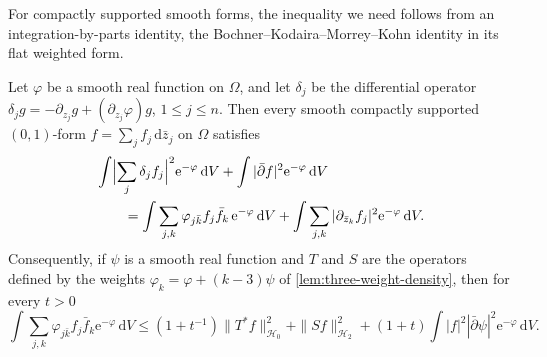 For compactly supported smooth forms, the inequality we need follows from an integration-by-parts identity, the Bochner--Kodaira--Morrey--Kohn identity in its flat weighted form.

\begin{proposition}\label{prop:interior-bochner-identity}
Let $\varphi$ be a smooth real function on $\Omega$, and let $\delta_j$ be the differential operator $\delta_jg=-\partial_{z_j}g+(\partial_{z_j}\varphi)g$, $1\le j\le n$. Then every smooth compactly supported $(0,1)$-form $f=\sum_jf_j\,\mathrm d\bar z_j$ on $\Omega$ satisfies
\[
 \begin{split}
 &\int\Bigl|\sum_j\delta_j f_j\Bigr|^2\mathrm e^{-\varphi}\,\mathrm dV
   +\int|\bar\partial f|^2\mathrm e^{-\varphi}\,\mathrm dV\\
 &\qquad=\int\sum_{j,k}\varphi_{j\bar k}f_j\bar f_k\,\mathrm e^{-\varphi}\,\mathrm dV
   +\int\sum_{j,k}|\partial_{\bar z_k}f_j|^2\mathrm e^{-\varphi}\,\mathrm dV.
 \end{split}
\]
Consequently, if $\psi$ is a smooth real function and $T$ and $S$ are the operators defined by the weights $\varphi_k=\varphi+(k-3)\psi$ of \cref{lem:three-weight-density}, then for every $t>0$
\begin{equation}\label{eq:three-weight-basic-estimate}
 \int\sum_{j,k}\varphi_{j\bar k}f_j\bar f_k\mathrm e^{-\varphi}\,\mathrm dV
 \le(1+t^{-1})\|T^*f\|_{\mathcal H_0}^2+\|Sf\|_{\mathcal H_2}^2
      +(1+t)\int|f|^2|\bar\partial\psi|^2\mathrm e^{-\varphi}\,\mathrm dV.
\end{equation}
\end{proposition}

